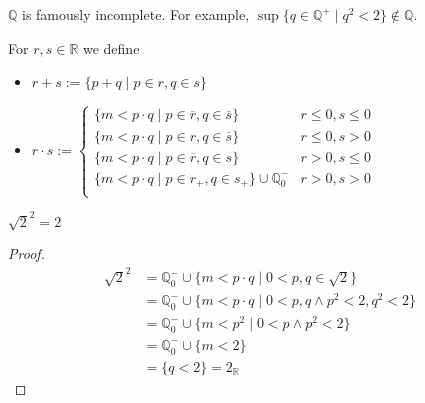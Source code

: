 \documentclass{whrartcl}
\newcommand{\QQ}{\mathbb{Q}}
\newcommand{\RR}{\mathbb{R}}
\newcommand{\ol}[1]{\overline{#1}}
\begin{document}
\begin{observation}
  $\QQ$ is famously incomplete. For example, $\sup \{q \in \QQ^+ \mid q^2 < 2\}
  \not\in \QQ$.
\end{observation}

\begin{definition}
  For $r, s \in \RR$ we define
  \begin{itemize}
  \item $r + s := \{p + q \mid p \in r, q \in s\}$
  \item $r \cdot s :=
    \begin{cases}
      \{m < p \cdot q \mid p \in \ol{r}, q \in \ol{s}\} & r \leq 0, s \leq 0 \\
      \{m < p \cdot q \mid p \in r, q \in \ol{s} \} & r \leq 0, s > 0 \\
      \{m < p \cdot q \mid p \in \ol{r}, q \in s \} & r > 0, s \leq 0 \\
      \{m < p \cdot q \mid p \in r_+, q \in s_+ \} \cup \QQ^-_0 & r > 0, s > 0 \\
    \end{cases}
    $
  \end{itemize}
\end{definition}

\begin{proposition}
  $\sqrt{2}^2 = 2$
\end{proposition}
\begin{proof}
  \begin{align*}
    \sqrt{2}^2 & = \QQ^-_0 \cup \{m < p \cdot q \mid 0 < p, q \in \sqrt{2}\} \\
               & = \QQ^-_0 \cup \{m < p \cdot q \mid 0 < p, q \wedge p^2 < 2, q^2 < 2\} \\
               & = \QQ^-_0 \cup \{m < p^2 \mid 0 < p\wedge p^2 < 2\} \\
               & = \QQ^-_0 \cup \{m < 2\} \\
               & = \{q < 2\} = 2_\RR
  \end{align*}
\end{proof}
\end{document}
